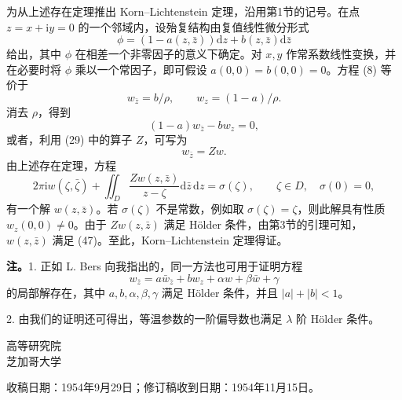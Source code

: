 \documentclass[UTF8,a4paper,11pt,fontset=fandol]{ctexart}
\newcommand{\dd}{\mathrm d}
\newcommand{\ii}{\mathrm i}
\newcommand{\dz}{\dd\bar z\,\dd z}
\newcommand{\zz}{\bar\zeta}
\begin{document}
为从上述存在定理推出 Korn--Lichtenstein 定理，沿用第1节的记号。在点 $z=x+\ii y=0$ 的一个邻域内，设殆复结构由复值线性微分形式
\begin{equation}\phi=(1-a(z,\bar z))\dd z+b(z,\bar z)\dd\bar z\tag{46}\end{equation}
给出，其中 $\phi$ 在相差一个非零因子的意义下确定。对 $x,y$ 作常系数线性变换，并在必要时将 $\phi$ 乘以一个常因子，即可假设 $a(0,0)=b(0,0)=0$。方程 (8) 等价于
\[w_{\bar z}=b/\rho,\qquad w_z=(1-a)/\rho.\]
消去 $\rho$，得到
\[(1-a)w_{\bar z}-bw_z=0,\]
或者，利用 (29) 中的算子 $Z$，可写为
\begin{equation}w_{\bar z}=Zw.\tag{47}\end{equation}
由上述存在定理，方程
\begin{equation}2\pi\ii w(\zeta,\zz)+\iint_D\frac{Zw(z,\bar z)}{z-\zeta}\dz=\sigma(\zeta),\qquad\zeta\in D,\quad\sigma(0)=0,\tag{48}\end{equation}
有一个解 $w(z,\bar z)$。若 $\sigma(\zeta)$ 不是常数，例如取 $\sigma(\zeta)=\zeta$，则此解具有性质 $w_z(0,0)\ne0$。由于 $Zw(z,\bar z)$ 满足 Hölder 条件，由第3节的引理可知，$w(z,\bar z)$ 满足 (47)。至此，Korn--Lichtenstein 定理得证。

\textbf{注。}1. 正如 L. Bers 向我指出的，同一方法也可用于证明方程
\begin{equation}w_{\bar z}=a\bar w_{\bar z}+bw_z+\alpha w+\beta\bar w+\gamma\tag{49}\end{equation}
的局部解存在，其中 $a,b,\alpha,\beta,\gamma$ 满足 Hölder 条件，并且 $|a|+|b|<1$。

2. 由我们的证明还可得出，等温参数的一阶偏导数也满足 $\lambda$ 阶 Hölder 条件。

\begin{flushright}高等研究院\\芝加哥大学\end{flushright}
\vfill
{\footnotesize 收稿日期：1954年9月29日；修订稿收到日期：1954年11月15日。}
\end{document}
